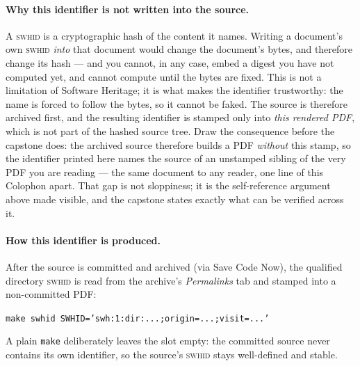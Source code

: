 \paragraph{Why this identifier is not written into the source.}
A \textsc{swhid} is a cryptographic hash of the content it names. Writing a document's own
\textsc{swhid} \emph{into} that document would change the document's bytes, and therefore
change its hash --- and you cannot, in any case, embed a digest you have not computed yet, and
cannot compute until the bytes are fixed. This is not a limitation of Software Heritage; it is what
makes the identifier
trustworthy: the name is forced to follow the bytes, so it cannot be faked. The source is
therefore archived first, and the resulting identifier is stamped only into \emph{this
rendered PDF}, which is not part of the hashed source tree.
Draw the consequence before the capstone does: the archived source therefore builds a PDF
\emph{without} this stamp, so the identifier printed here names the source of an unstamped
sibling of the very PDF you are reading --- the same document to any reader, one line of this
Colophon apart. That gap is not sloppiness; it is the self-reference argument above made
visible, and the capstone states exactly what can be verified across it.

\paragraph{How this identifier is produced.}
After the source is committed and archived (via Save Code Now), the qualified directory
\textsc{swhid} is read from the archive's \emph{Permalinks} tab and stamped into a
non-committed PDF:
\begin{center}
\texttt{make swhid SWHID='swh:1:dir:...;origin=...;visit=...'}
\end{center}
A plain \texttt{make} deliberately leaves the slot empty: the committed source never contains
its own identifier, so the source's \textsc{swhid} stays well-defined and stable.

